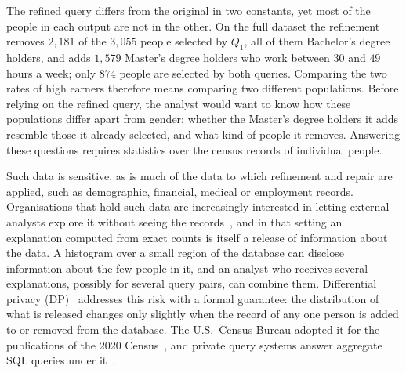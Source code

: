 The refined query differs from the original in two constants, yet most of the people in each output are not in the other.
On the full dataset the refinement removes $2{,}181$ of the $3{,}055$ people selected by $Q_1$, all of them Bachelor's degree holders, and adds $1{,}579$ Master's degree holders who work between $30$ and $49$ hours a week; only $874$ people are selected by both queries.
Comparing the two rates of high earners therefore means comparing two different populations.
Before relying on the refined query, the analyst would want to know how these populations differ apart from gender: whether the Master's degree holders it adds resemble those it already selected, and what kind of people it removes.
Answering these questions requires statistics over the census records of individual people.

Such data is sensitive, as is much of the data to which refinement and repair are applied, such as demographic, financial, medical or employment records.
Organisations that hold such data are increasingly interested in letting external analysts explore it without seeing the records~\cite{GeHIM19}, and in that setting an explanation computed from exact counts is itself a release of information about the data.
A histogram over a small region of the database can disclose information about the few people in it, and an analyst who receives several explanations, possibly for several query pairs, can combine them.
Differential privacy (DP)~\cite{DMNS2006,TheAlgFoundDP2014} addresses this risk with a formal guarantee: the distribution of what is released changes only slightly when the record of any one person is added to or removed from the database.
The U.S.\ Census Bureau adopted it for the publications of the 2020 Census~\cite{Abowd18}, and private query systems answer aggregate SQL queries under it~\cite{mcsherry2009,JNS18,JNHS20}.


